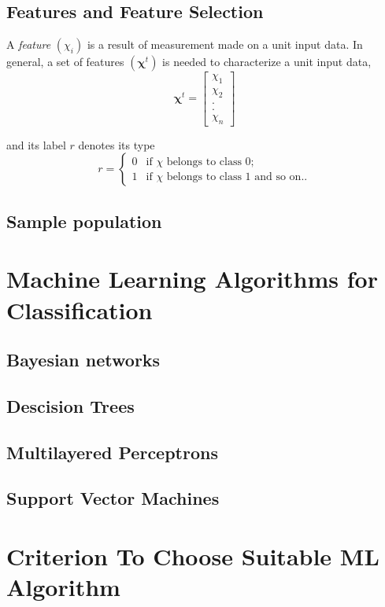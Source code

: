 \subsection{Features and Feature Selection}
A \emph{feature} $(\chi_i)$ is a result of measurement made on a unit input data. In general, a set of features $(\boldsymbol{\chi}^t)$ is needed to characterize a unit input data,
\[ \boldsymbol{\chi}^t = 
\left[ \begin{array}{c}
\chi_1\\
\chi_2 \\
.\\
.\\
\chi_n \end{array} \right]\]  

and its label $r$ denotes its type
\[ r = \left\{ \begin{array}{ll}
         0 & \mbox{if $\chi$ belongs to class 0};\\
         1 & \mbox{if $\chi$ belongs to class 1 and so on..}\end{array} \right. \] 


\subsection{Sample population}

\section{Machine Learning Algorithms for Classification}
\label{sec:c3mlclassification}

\subsection{Bayesian networks}

\subsection{Descision Trees}

\subsection{Multilayered Perceptrons}

\subsection{Support Vector Machines}

\section{Criterion To Choose Suitable ML Algorithm}
\label{sec:c3mlselection}

